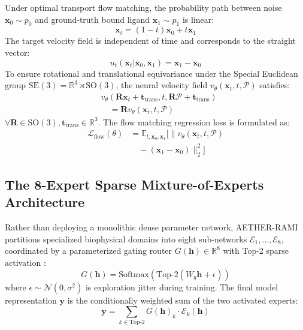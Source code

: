 Under optimal transport flow matching, the probability path between noise $\mathbf{x}_0 \sim p_0$ and ground-truth bound ligand $\mathbf{x}_1 \sim p_1$ is linear:
\begin{equation}
\mathbf{x}_t = (1 - t)\mathbf{x}_0 + t\mathbf{x}_1
\label{eq:ot_path}
\end{equation}
The target velocity field is independent of time and corresponds to the straight vector:
\begin{equation}
u_t(\mathbf{x}_t | \mathbf{x}_0, \mathbf{x}_1) = \mathbf{x}_1 - \mathbf{x}_0
\label{eq:ot_velocity}
\end{equation}
To ensure rotational and translational equivariance under the Special Euclidean group $\mathrm{SE}(3) = \mathbb{R}^3 \rtimes \mathrm{SO}(3)$, the neural velocity field $v_\theta(\mathbf{x}_t, t, \mathcal{P})$ satisfies:
\begin{equation}
\begin{split}
&v_\theta(\mathbf{R}\mathbf{x}_t + \mathbf{t}_{\text{trans}}, t, \mathbf{R}\mathcal{P} + \mathbf{t}_{\text{trans}}) \\
&\quad = \mathbf{R} v_\theta(\mathbf{x}_t, t, \mathcal{P})
\end{split}
\label{eq:se3_equiv}
\end{equation}
$\forall \mathbf{R} \in \mathrm{SO}(3), \mathbf{t}_{\text{trans}} \in \mathbb{R}^3$. The flow matching regression loss is formulated as:
\begin{equation}
\begin{split}
\mathcal{L}_{\text{flow}}(\theta) &= \mathbb{E}_{t, \mathbf{x}_0, \mathbf{x}_1} \Big[ \big\| v_\theta(\mathbf{x}_t, t, \mathcal{P}) \\
&\quad - (\mathbf{x}_1 - \mathbf{x}_0) \big\|_2^2 \Big]
\end{split}
\label{eq:flow_loss}
\end{equation}

\subsection{The 8-Expert Sparse Mixture-of-Experts Architecture}
Rather than deploying a monolithic dense parameter network, AETHER-RAMI partitions specialized biophysical domains into eight sub-networks $\mathcal{E}_1, \dots, \mathcal{E}_8$, coordinated by a parameterized gating router $G(\mathbf{h}) \in \mathbb{R}^8$ with Top-2 sparse activation \cite{shazeer2017outrageously}:
\begin{equation}
G(\mathbf{h}) = \text{Softmax}\left( \text{Top-2}\left( W_g \mathbf{h} + \epsilon \right) \right)
\label{eq:moe_gate}
\end{equation}
where $\epsilon \sim \mathcal{N}(0, \sigma^2)$ is exploration jitter during training. The final model representation $\mathbf{y}$ is the conditionally weighted sum of the two activated experts:
\begin{equation}
\mathbf{y} = \sum_{k \in \text{Top-2}} G(\mathbf{h})_k \cdot \mathcal{E}_k(\mathbf{h})
\label{eq:moe_output}
\end{equation}

